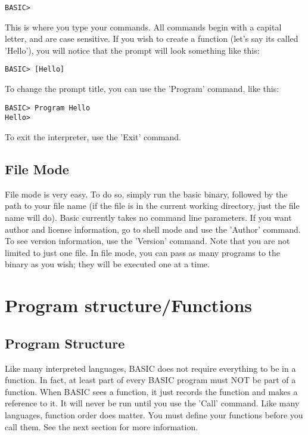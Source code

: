 \documentclass{report}
\begin{document}
\begin{lstlisting}
BASIC>
\end{lstlisting}

\noindent This is where you type your commands. All commands begin with a capital letter, and are case sensitive. If you wish to create a function (let's say its called 'Hello'), you will notice that the prompt will look something like this:

\begin{lstlisting}
BASIC> [Hello]
\end{lstlisting}

\noindent To change the prompt title, you can use the 'Program' command, like this:

\begin{lstlisting}
BASIC> Program Hello
Hello>
\end{lstlisting}

\noindent To exit the interpreter, use the 'Exit' command.

\section{File Mode}
File mode is very easy. To do so, simply run the basic binary, followed by the path to your file name (if the file is in the current working directory, just the file name will do). Basic currently takes no command line parameters. If you want author and license information, go to shell mode and use the 'Author' command. To see version information, use the 'Version' command. Note that you are not limited to just one file. In file mode, you can pass as many programs to the binary as you wish; they will be executed one at a time.

\chapter{Program structure/Functions}

\section{Program Structure}

Like many interpreted languages, BASIC does not require everything to be in a function. In fact, at least part of every BASIC program must NOT be part of a function. When BASIC sees a function, it just records the function and makes a reference to it. It will never be run until you use the 'Call' command. Like many languages, function order does matter. You must define your functions before you call them. See the next section for more information.
\end{document}
